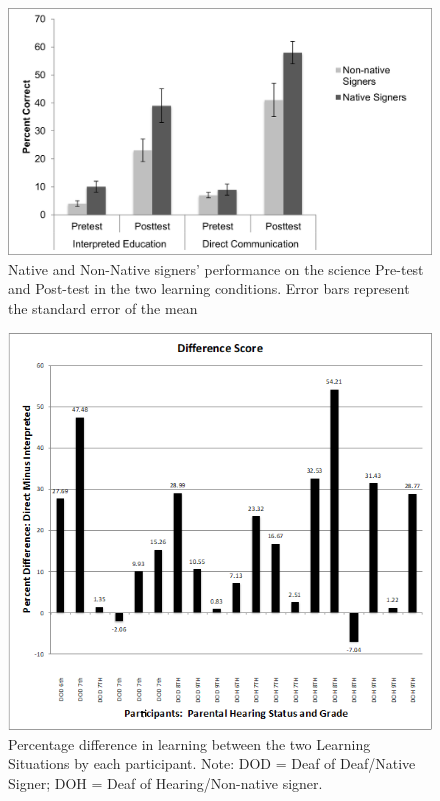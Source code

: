 \documentclass[11.5pt]{sig-alternate} %
\begin{document}
\begin{large}
\begin{figure}[h]
    \centering
    \includegraphics[width=1\linewidth]{images/fig2.png}
    \caption{Native and Non-Native signers’ performance on the science Pre-test and Post-test in the two learning conditions. Error bars represent the standard error of the mean}
\end{figure}

\begin{figure}[h]
    \centering
    \includegraphics[width=1\linewidth]{images/fig3.png}
    \caption{Percentage difference in learning between the two Learning Situations by each participant. Note: DOD = Deaf of Deaf/Native Signer; DOH = Deaf of Hearing/Non-native signer.}
\end{figure}


\end{large}
\end{document}

